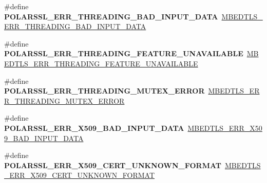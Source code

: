 \begin{DoxyCompactItemize}
\item 
\mbox{\label{compat-1_83_8h_a0e208074a998f6ab35e6fc475dce82a0}} 
\#define {\bfseries P\+O\+L\+A\+R\+S\+S\+L\+\_\+\+E\+R\+R\+\_\+\+T\+H\+R\+E\+A\+D\+I\+N\+G\+\_\+\+B\+A\+D\+\_\+\+I\+N\+P\+U\+T\+\_\+\+D\+A\+TA}~\mbox{\hyperlink{threading_8h_a76cd79a1ed3fd583ed3a4428d6a1e967}{M\+B\+E\+D\+T\+L\+S\+\_\+\+E\+R\+R\+\_\+\+T\+H\+R\+E\+A\+D\+I\+N\+G\+\_\+\+B\+A\+D\+\_\+\+I\+N\+P\+U\+T\+\_\+\+D\+A\+TA}}
\item 
\mbox{\label{compat-1_83_8h_a303fd054cffb4960922186d69989d8d2}} 
\#define {\bfseries P\+O\+L\+A\+R\+S\+S\+L\+\_\+\+E\+R\+R\+\_\+\+T\+H\+R\+E\+A\+D\+I\+N\+G\+\_\+\+F\+E\+A\+T\+U\+R\+E\+\_\+\+U\+N\+A\+V\+A\+I\+L\+A\+B\+LE}~\mbox{\hyperlink{threading_8h_ad3cbda6bbb5ce837b33ada893d7d5613}{M\+B\+E\+D\+T\+L\+S\+\_\+\+E\+R\+R\+\_\+\+T\+H\+R\+E\+A\+D\+I\+N\+G\+\_\+\+F\+E\+A\+T\+U\+R\+E\+\_\+\+U\+N\+A\+V\+A\+I\+L\+A\+B\+LE}}
\item 
\mbox{\label{compat-1_83_8h_afea02eb560c790911a89035bbcc909ad}} 
\#define {\bfseries P\+O\+L\+A\+R\+S\+S\+L\+\_\+\+E\+R\+R\+\_\+\+T\+H\+R\+E\+A\+D\+I\+N\+G\+\_\+\+M\+U\+T\+E\+X\+\_\+\+E\+R\+R\+OR}~\mbox{\hyperlink{threading_8h_a51005c51b928706511d3c2ea3390c07f}{M\+B\+E\+D\+T\+L\+S\+\_\+\+E\+R\+R\+\_\+\+T\+H\+R\+E\+A\+D\+I\+N\+G\+\_\+\+M\+U\+T\+E\+X\+\_\+\+E\+R\+R\+OR}}
\item 
\mbox{\label{compat-1_83_8h_a59ea8fbabf8eae3f006824230bc27d6c}} 
\#define {\bfseries P\+O\+L\+A\+R\+S\+S\+L\+\_\+\+E\+R\+R\+\_\+\+X509\+\_\+\+B\+A\+D\+\_\+\+I\+N\+P\+U\+T\+\_\+\+D\+A\+TA}~\mbox{\hyperlink{group__x509__module_gaeeef11ebf0b31a54a665b1a3fd65c3f7}{M\+B\+E\+D\+T\+L\+S\+\_\+\+E\+R\+R\+\_\+\+X509\+\_\+\+B\+A\+D\+\_\+\+I\+N\+P\+U\+T\+\_\+\+D\+A\+TA}}
\item 
\mbox{\label{compat-1_83_8h_a2a86f0efb25d083307eadf96585d4222}} 
\#define {\bfseries P\+O\+L\+A\+R\+S\+S\+L\+\_\+\+E\+R\+R\+\_\+\+X509\+\_\+\+C\+E\+R\+T\+\_\+\+U\+N\+K\+N\+O\+W\+N\+\_\+\+F\+O\+R\+M\+AT}~\mbox{\hyperlink{group__x509__module_gaeb90af9ad906c5075b1ad625ebc26553}{M\+B\+E\+D\+T\+L\+S\+\_\+\+E\+R\+R\+\_\+\+X509\+\_\+\+C\+E\+R\+T\+\_\+\+U\+N\+K\+N\+O\+W\+N\+\_\+\+F\+O\+R\+M\+AT}}
\item 
\mbox{\label{compat-1_83_8h_a2712a2708993f706e6c3f3716ec1f275}} 

\end{DoxyCompactItemize}
